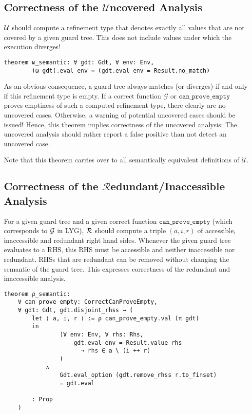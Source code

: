\subsection{Correctness of the $\mathcal{U}$ncovered Analysis}
\label{sec:formalizationSemanticU}

$\mathcal{U}$ should compute a refinement type that denotes exactly all values that are not covered by a given guard tree.
This does not include values under which the execution diverges!

\begin{verbatim}
theorem ω_semantic: ∀ gdt: Gdt, ∀ env: Env,
        (ω gdt).eval env ↔ (gdt.eval env = Result.no_match)
\end{verbatim}

As an obvious consequence, a guard tree always matches (or diverges) if and only if this refinement type is empty. If a correct function $\mathcal{G}$ or $\mathtt{can\_prove\_empty}$ proves emptiness of such a computed refinement type, there clearly are no uncovered cases. Otherwise, a warning of potential uncovered cases should be issued! Hence, this theorem implies correctness of the uncovered analysis:
The uncovered analysis should rather report a false positive than not detect an uncovered case.

Note that this theorem carries over to all semantically equivalent definitions of $\mathcal{U}$.

\subsection{Correctness of the $\mathcal{R}$edundant/Inaccessible Analysis}
\label{sec:formalizationSemanticRA}

For a given guard tree and a given correct function $\mathtt{can\_prove\_empty}$ (which corresponds to $\mathcal{G}$ in LYG), $\mathcal{R}$
should compute a triple $(a, i, r)$ of accessible, inaccessible and redundant right hand sides.
Whenever the given guard tree evaluates to a RHS, this RHS must be accessible and neither inaccessible nor redundant.
RHSs that are redundant can be removed without changing the semantic of the guard tree.
This expresses correctness of the redundant and inaccessible analysis.

\begin{verbatim}
theorem ρ_semantic:
    ∀ can_prove_empty: CorrectCanProveEmpty,
    ∀ gdt: Gdt, gdt.disjoint_rhss → (
        let ⟨ a, i, r ⟩ := ρ can_prove_empty.val (π gdt)
        in
                (∀ env: Env, ∀ rhs: Rhs,
                    gdt.eval env = Result.value rhs
                      → rhs ∈ a \ (i ++ r)
                )
            ∧
                Gdt.eval_option (gdt.remove_rhss r.to_finset)
                = gdt.eval

        : Prop
    )
\end{verbatim}


